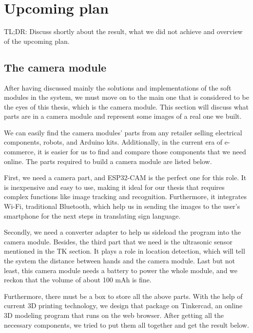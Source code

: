 \chapter{Upcoming plan}

TL;DR: Discuss shortly about the result, what we did not achieve and overview of the upcoming plan.

\section{The camera module}

After having discussed mainly the solutions and implementations of the soft modules in the system, we must move on to the main one that is considered to be the eyes of this thesis, which is the camera module. This section will discuss what parts are in a camera module and represent some images of a real one we built.

We can easily find the camera modules' parts from any retailer selling electrical components, robots, and Arduino kits. Additionally, in the current era of e-commerce, it is easier for us to find and compare those components that we need online. The parts required to build a camera module are listed below.

First, we need a camera part, and ESP32-CAM is the perfect one for this role. It is inexpensive and easy to use, making it ideal for our thesis that requires complex functions like image tracking and recognition. Furthermore, it integrates Wi-Fi, traditional Bluetooth, which help us in sending the images to the user's smartphone for the next steps in translating sign language.

Secondly, we need a converter adapter to help us sideload the program into the camera module. Besides, the third part that we need is the ultrasonic sensor mentioned in the TK section. It plays a role in location detection, which will tell the system the distance between hands and the camera module. Last but not least, this camera module needs a battery to power the whole module, and we reckon that the volume of about 100 mAh is fine.

Furthermore, there must be a box to store all the above parts. With the help of current 3D printing technology, we design that package on Tinkercad, an online 3D modeling program that runs on the web browser. After getting all the necessary components, we tried to put them all together and get the result below.


